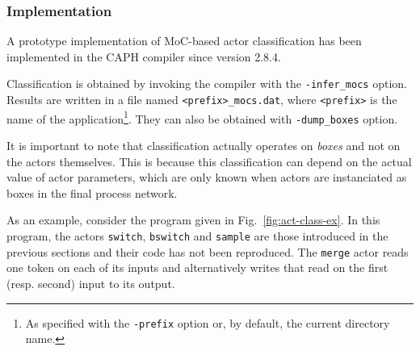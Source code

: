 \subsubsection{Implementation}
\label{sec:moc-class-impl}

A prototype implementation of MoC-based actor classification has been implemented in the CAPH
compiler since version 2.8.4. 

Classification is obtained by invoking the compiler with the \verb|-infer_mocs| option. Results are
written in a file named \verb|<prefix>_mocs.dat|, where \verb|<prefix>| is the name of the
application\footnote{As specified with the \texttt{-prefix} option or, by default, the current
  directory name.}. They can also be obtained with \verb|-dump_boxes| option. 

It is important to note that classification actually operates on \emph{boxes} and not on the actors
themselves. This is because this classification can depend on the actual value of actor
parameters, which are only known when actors are instanciated as boxes in the final process network.

\medskip
As an example, consider the program given in Fig.~\ref{fig:act-class-ex}. In this program, the
actors \verb|switch|, \verb|bswitch| and \verb|sample| are those introduced in the previous sections
and their code has not been reproduced. The \verb|merge| actor reads one token on each of its inputs
and alternatively writes that read on the first (resp. second) input to its output.

